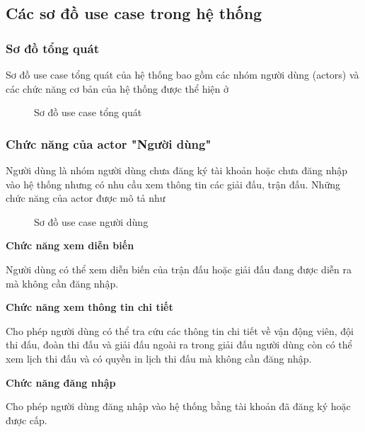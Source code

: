 \subsection{Các sơ đồ use case trong hệ thống}
\setcounter{subsubsection}{0}
\setcounter{figure}{0}

% 

\subsubsection{Sơ đồ tổng quát}
Sơ đồ use case tổng quát của hệ thống bao gồm các nhóm người dùng
(actors) và các chức năng cơ bản của hệ thống được thể hiện ở 

\begin{figure}[H]
  \centering
  
  \caption{Sơ đồ use case tổng quát}
  \label{fig:uc-1}
\end{figure}

\subsubsection{Chức năng của actor "Người dùng"}
Người dùng là nhóm người dùng chưa đăng ký tài khoản hoặc chưa đăng nhập vào hệ thống nhưng có nhu cầu xem thông tin các giải đấu, trận đấu.
Những chức năng của actor được mô tả như

\begin{figure}[H]
  \centering
  
  \caption{Sơ đồ use case người dùng}
  \label{fig:uc-2}
\end{figure}

\noindent
\textbf{Chức năng xem diễn biến}

Người dùng có thể xem diễn biến của trận đấu hoặc giải đấu đang được diễn ra mà
không cần đăng nhập.

\noindent
\textbf{Chức năng xem thông tin chi tiết}

Cho phép người dùng có thể tra cứu các thông tin chi tiết về vận động viên,
đội thi đấu, đoàn thi đấu và giải đấu ngoài ra trong giải đấu người dùng còn có
thể xem lịch thi đấu và có quyền in lịch thi đấu mà không cần đăng nhập.

\noindent
\textbf{Chức năng đăng nhập}

Cho phép người dùng đăng nhập vào hệ thống bằng tài khoản đã đăng ký hoặc được cấp.

